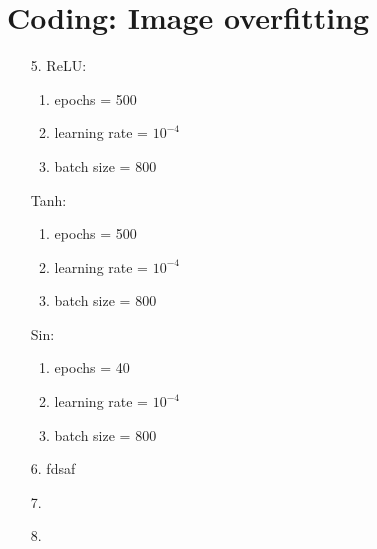 \documentclass[12pt]{article}
\begin{document}
\section{Coding: Image overfitting}
\begin{enumerate}
    \item[5.]   
    ReLU:
    \begin{enumerate}
        \item epochs = 500
        \item learning rate = $10^{-4}$
        \item batch size = 800
    \end{enumerate}
    Tanh:
    \begin{enumerate}
        \item epochs = 500
        \item learning rate = $10^{-4}$
        \item batch size = 800
    \end{enumerate}
    Sin:
    \begin{enumerate}
        \item epochs = 40
        \item learning rate = $10^{-4}$
        \item batch size = 800
    \end{enumerate}

    \item[6.] fdsaf
    \item[7.] 
    \item[8.] 
        
\end{enumerate}
\end{document}
